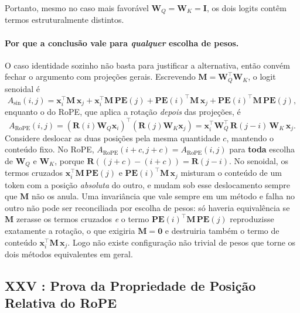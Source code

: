 \documentclass{dlproblemset}
\begin{document}
Portanto, mesmo no caso mais favorável $\mathbf{W}_Q = \mathbf{W}_K = \mathbf{I}$, os dois logits
contêm termos estruturalmente distintos.

\paragraph{Por que a conclusão vale para \emph{qualquer} escolha de pesos.}
O caso identidade sozinho não basta para justificar a alternativa, então convém
fechar o argumento com projeções gerais. Escrevendo $\mathbf{M} = \mathbf{W}_Q^\top \mathbf{W}_K$,
o logit senoidal é
\[
  A_{\mathrm{sin}}(i,j)
  = \mathbf{x}_i^\top \mathbf{M}\, \mathbf{x}_j
  + \mathbf{x}_i^\top \mathbf{M}\, \mathbf{PE}(j)
  + \mathbf{PE}(i)^\top \mathbf{M}\, \mathbf{x}_j
  + \mathbf{PE}(i)^\top \mathbf{M}\, \mathbf{PE}(j),
\]
enquanto o do RoPE, que aplica a rotação \emph{depois} das projeções, é
\[
  A_{\mathrm{RoPE}}(i,j)
  = (\mathbf{R}(i)\mathbf{W}_Q\mathbf{x}_i)^\top (\mathbf{R}(j)\mathbf{W}_K\mathbf{x}_j)
  = \mathbf{x}_i^\top \mathbf{W}_Q^\top\, \mathbf{R}(j-i)\, \mathbf{W}_K\, \mathbf{x}_j.
\]
Considere deslocar as duas posições pela mesma quantidade $c$, mantendo o conteúdo
fixo. No RoPE, $A_{\mathrm{RoPE}}(i+c, j+c) = A_{\mathrm{RoPE}}(i,j)$ para
\textbf{toda} escolha de $\mathbf{W}_Q$ e $\mathbf{W}_K$, porque $\mathbf{R}((j+c)-(i+c)) = \mathbf{R}(j-i)$.
No senoidal, os termos cruzados $\mathbf{x}_i^\top \mathbf{M}\, \mathbf{PE}(j)$ e
$\mathbf{PE}(i)^\top \mathbf{M}\, \mathbf{x}_j$ misturam o conteúdo de um token com a posição
\emph{absoluta} do outro, e mudam sob esse deslocamento sempre que $\mathbf{M}$ não os
anula. Uma invariância que vale sempre em um método e falha no outro não pode ser
reconciliada por escolha de pesos: só haveria equivalência se $\mathbf{M}$ zerasse os
termos cruzados \emph{e} o termo $\mathbf{PE}(i)^\top \mathbf{M}\, \mathbf{PE}(j)$ reproduzisse
exatamente a rotação, o que exigiria $\mathbf{M} = \mathbf{0}$ e destruiria também o termo de
conteúdo $\mathbf{x}_i^\top \mathbf{M}\, \mathbf{x}_j$. Logo não existe configuração não trivial de
pesos que torne os dois métodos equivalentes em geral.

\subsection*{XXV {\mdseries{}}: Prova da Propriedade de Posição Relativa do RoPE}
\end{document}
